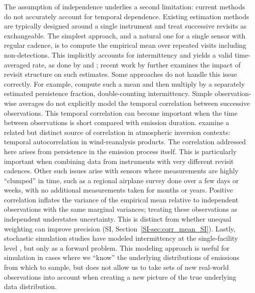 \documentclass[numsec,webpdf,modern,mediumone]{oup-authoring-template}
\newcommand{\new}[1]{#1}
\begin{document}
The assumption of independence underlies a second limitation: current methods do not accurately account for temporal dependence. Existing estimation methods are typically designed around a single instrument and treat successive revisits as exchangeable. The simplest approach, and a natural one for a single sensor with regular cadence, is to compute the empirical mean over repeated visits including non-detections. This implicitly accounts for intermittency and yields a valid time-averaged rate, as done by \citet{Chen2022EST} and \citet{Sherwin2024Nature}\new{; recent work by \citet{Conrad2023} further examines the impact of revisit structure on such estimates}. Some approaches do not handle this issue correctly. For example, \citet{Williams2025ACP} compute such a mean and then multiply by a separately estimated persistence fraction, double-counting intermittency. Simple observation-wise averages do not explicitly model the temporal correlation between successive observations. This temporal correlation can become important when the time between observations is short compared with emission duration. \citet{ConradJohnson2025} examine a related but distinct source of correlation in atmospheric inversion contexts: temporal autocorrelation in wind-reanalysis products. The correlation addressed here arises from persistence in the emission process itself. This is particularly important when combining data from instruments with very different revisit cadences. Other such issues arise with sensors where measurements are highly ``clumped'' in time, such as a regional airplane survey done over a few days or weeks, with no additional measurements taken for months or years. Positive correlation inflates the variance of the empirical mean relative to independent observations with the same marginal variances; treating these observations as independent understates uncertainty. This is distinct from whether unequal weighting can improve precision (SI, Section~\ref{SI-sec:corr_mean_SI}).
Lastly, stochastic simulation studies have modeled intermittency at the single-facility level \citep{Hodshire2025}, but only as a forward problem. This modeling approach is useful for simulation in cases where we ``know'' the underlying distributions of emissions from which to sample, but does not allow us to take sets of new real-world observations into account when creating a new picture of the true underlying data distribution.


\end{document}
